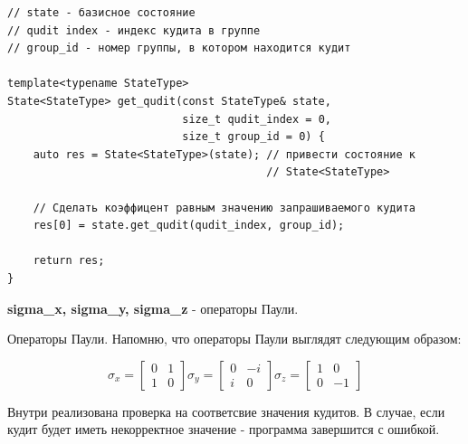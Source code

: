 \documentclass[12pt,fleqn]{article}
\begin{document}
\begin{mdframed}[linecolor=black, topline=true, bottomline=true,
leftline=false, rightline=false]
\begin{verbatim}
// state - базисное состояние
// qudit index - индекс кудита в группе
// group_id - номер группы, в котором находится кудит

template<typename StateType>
State<StateType> get_qudit(const StateType& state,
                           size_t qudit_index = 0,
                           size_t group_id = 0) {
    auto res = State<StateType>(state); // привести состояние к
                                        // State<StateType>

    // Сделать коэффицент равным значению запрашиваемого кудита
    res[0] = state.get_qudit(qudit_index, group_id);

    return res;
}
\end{verbatim}
\end{mdframed}

        \begin{center}
            \textbf{sigma\_x, sigma\_y, sigma\_z} - операторы Паули.
        \end{center}

        Операторы Паули. Напомню, что операторы Паули выглядят следующим образом:

        $$
        {\sigma}_{x} = \begin{bmatrix}
                    0 & 1\\
                    1 & 0
                    \end{bmatrix}
        \sigma_{y} = \begin{bmatrix}
                    0 & -i\\
                    i & 0
                    \end{bmatrix}
        \sigma_{z} = \begin{bmatrix}
                    1 & 0\\
                    0 & -1
                    \end{bmatrix}
        $$
        
        Внутри реализована проверка на соответсвие значения кудитов. В случае, если кудит будет иметь некорректное значение - программа завершится с ошибкой.
\end{document}
